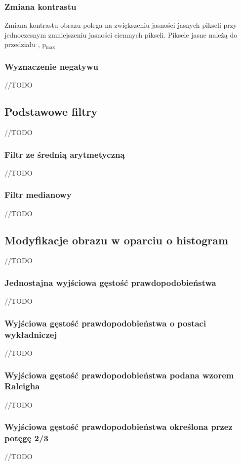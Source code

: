 \documentclass{classrep}
\begin{document}
\subsubsection{Zmiana kontrastu}
Zmiana kontrastu obrazu polega na zwiększeniu jasności jasnych pikseli przy jednoczesnym zmniejszeniu jasności ciemnych pikseli. Piksele jasne należą do przedziału , p$_{\text{max}}$

\subsubsection{Wyznaczenie negatywu}
//TODO

\subsection{Podstawowe filtry}
//TODO

\subsubsection{Filtr ze średnią arytmetyczną}
//TODO

\subsubsection{Filtr medianowy}
//TODO

\subsection{Modyfikacje obrazu w oparciu o histogram}
//TODO

\subsubsection{Jednostajna wyjściowa gęstość prawdopodobieństwa}
//TODO

\subsubsection{Wyjściowa gęstość prawdopodobieństwa o postaci wykładniczej}
//TODO

\subsubsection{Wyjściowa gęstość prawdopodobieństwa podana wzorem Raleigha}
//TODO

\subsubsection{Wyjściowa gęstość prawdopodobieństwa określona przez potęgę 2/3}
//TODO
\end{document}
